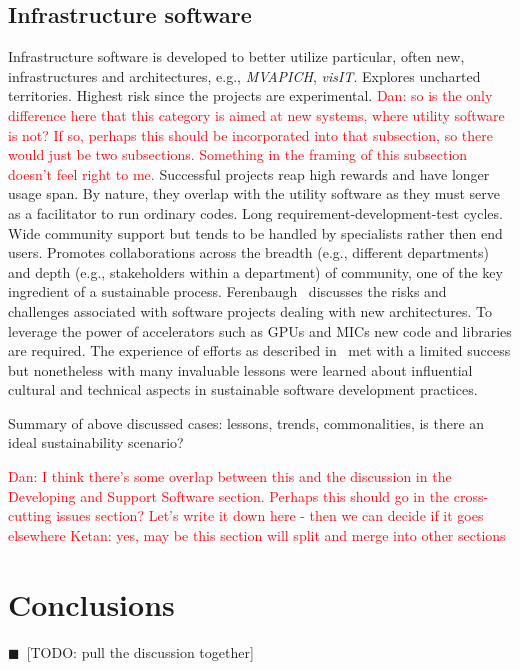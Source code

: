 \documentclass[11pt, oneside]{amsart}
\newcommand{\todo}[1]{{\color{blue}$\blacksquare$~\textsf{[TODO: #1]}}}
\newcommand{\note}[1]{ {\textcolor{red}    { #1 }}}
\begin{document}
\subsection{Infrastructure software}
Infrastructure software is developed to better utilize particular, often new, infrastructures and architectures,
e.g., \emph{MVAPICH}, \emph{visIT}. Explores uncharted territories. Highest
risk since the projects are experimental. \note{Dan: so is the only difference here that
this category is aimed at new systems, where utility software is not?  If so, perhaps this should be incorporated into that subsection, so there would just be two subsections. Something in the framing of this subsection doesn't feel right to me.} Successful projects reap high rewards
and have longer usage span. By nature, they overlap with the utility software
as they must serve as a facilitator to run ordinary codes. Long
requirement-development-test cycles.  Wide community support but tends to be
handled by specialists rather then end users. Promotes collaborations across
the breadth (e.g., different departments) and depth (e.g., stakeholders within a
department) of community, one of the key ingredient of a sustainable process.
Ferenbaugh~\cite{Ferenbaugh_WSSSPE} discusses the risks and challenges
associated with software projects dealing with new architectures. To leverage
the power of accelerators such as GPUs and MICs new code and libraries are
required. The experience of efforts as described in~\cite{Ferenbaugh_WSSSPE}
met with a limited success but nonetheless with many invaluable lessons were
learned about influential cultural and technical aspects in sustainable software
development practices.

Summary of above discussed cases: lessons, trends, commonalities, is there an
ideal sustainability scenario?

\note{Dan: I think there's some overlap
  between this and the discussion in the Developing and Support
  Software section.  Perhaps this should go in the cross-cutting
  issues section?  Let's write it down here - then we can decide if it goes elsewhere}
\note{Ketan: yes, may be this section will split and merge into other sections}

\section{Conclusions} \label{sec:conclusions}

\todo{pull the discussion together}
\end{document}
